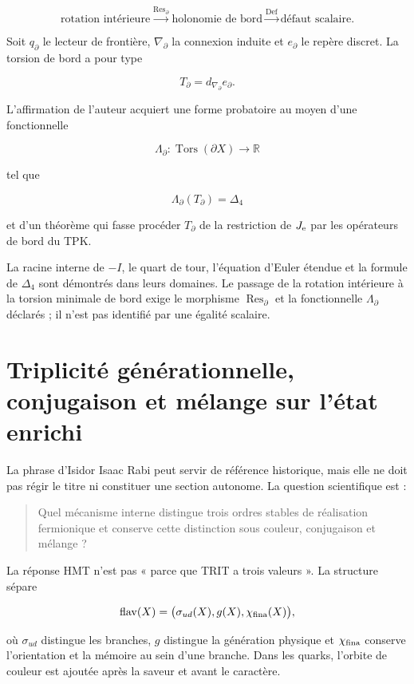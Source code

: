 \[
\text{rotation intérieure}
\xrightarrow{\operatorname{Res}_{\partial}}
\text{holonomie de bord}
\xrightarrow{\operatorname{Def}}
\text{défaut scalaire}.
\]

Soit \(q_\partial\) le lecteur de frontière, \(\nabla_\partial\) la connexion induite et \(e_\partial\) le repère discret. La torsion de bord a pour type

\[
T_\partial=d_{\nabla_\partial}e_\partial.
\]

L’affirmation de l’auteur acquiert une forme probatoire au moyen d’une fonctionnelle

\[
\Lambda_\partial:
\operatorname{Tors}(\partial X)
\longrightarrow\mathbb R
\]

tel que

\[
\Lambda_\partial(T_\partial)=\Delta_4
\]

et d’un théorème qui fasse procéder \(T_\partial\) de la restriction de \(J_{\rm e}\) par les opérateurs de bord du TPK.

La racine interne de \(-I\), le quart de tour, l’équation d’Euler étendue et la formule de \(\Delta_4\) sont démontrés dans leurs domaines. Le passage de la rotation intérieure à la torsion minimale de bord exige le morphisme \(\operatorname{Res}_{\partial}\) et la fonctionnelle \(\Lambda_{\partial}\) déclarés ; il n’est pas identifié par une égalité scalaire.


\section{Triplicité générationnelle, conjugaison et mélange sur l’état enrichi}

La phrase d’Isidor Isaac Rabi peut servir de référence historique, mais elle ne doit pas régir le titre ni constituer une section autonome. La question scientifique est :

\begin{quote}
Quel mécanisme interne distingue trois ordres stables de réalisation fermionique et conserve cette distinction sous couleur, conjugaison et mélange ?
\end{quote}

La réponse HMT n’est pas « parce que TRIT a trois valeurs ». La structure sépare

\[
\operatorname{flav}(X)
=\bigl(\sigma_{ud}(X),g(X),\chi_{\rm fina}(X)\bigr),
\]

où \(\sigma_{ud}\) distingue les branches, \(g\) distingue la génération physique et \(\chi_{\rm fina}\) conserve l’orientation et la mémoire au sein d’une branche. Dans les quarks, l’orbite de couleur est ajoutée après la saveur et avant le caractère.

